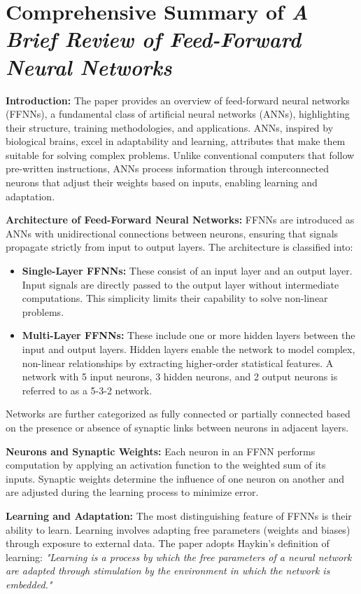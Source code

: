 \documentclass{article}
\begin{document}
\section*{Comprehensive Summary of \textit{A Brief Review of Feed-Forward Neural Networks}}

\textbf{Introduction:} The paper provides an overview of feed-forward neural networks (FFNNs), a fundamental class of artificial neural networks (ANNs), highlighting their structure, training methodologies, and applications. ANNs, inspired by biological brains, excel in adaptability and learning, attributes that make them suitable for solving complex problems. Unlike conventional computers that follow pre-written instructions, ANNs process information through interconnected neurons that adjust their weights based on inputs, enabling learning and adaptation.

\textbf{Architecture of Feed-Forward Neural Networks:} FFNNs are introduced as ANNs with unidirectional connections between neurons, ensuring that signals propagate strictly from input to output layers. The architecture is classified into:
\begin{itemize}
    \item \textbf{Single-Layer FFNNs:} These consist of an input layer and an output layer. Input signals are directly passed to the output layer without intermediate computations. This simplicity limits their capability to solve non-linear problems.
    \item \textbf{Multi-Layer FFNNs:} These include one or more hidden layers between the input and output layers. Hidden layers enable the network to model complex, non-linear relationships by extracting higher-order statistical features. A network with 5 input neurons, 3 hidden neurons, and 2 output neurons is referred to as a 5-3-2 network. 
\end{itemize}
Networks are further categorized as fully connected or partially connected based on the presence or absence of synaptic links between neurons in adjacent layers.

\textbf{Neurons and Synaptic Weights:} Each neuron in an FFNN performs computation by applying an activation function to the weighted sum of its inputs. Synaptic weights determine the influence of one neuron on another and are adjusted during the learning process to minimize error.

\textbf{Learning and Adaptation:} The most distinguishing feature of FFNNs is their ability to learn. Learning involves adapting free parameters (weights and biases) through exposure to external data. The paper adopts Haykin's definition of learning: \textit{"Learning is a process by which the free parameters of a neural network are adapted through stimulation by the environment in which the network is embedded."}
\end{document}
